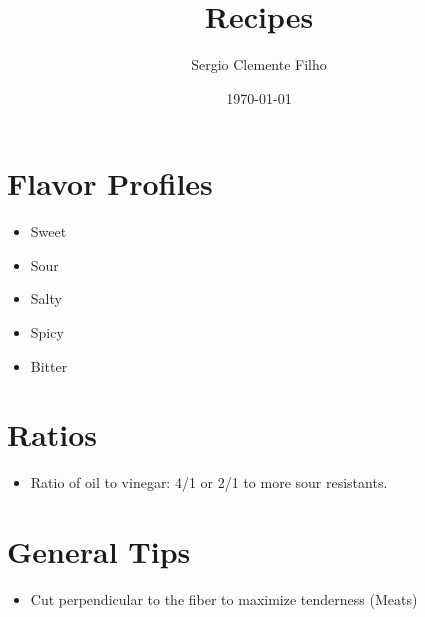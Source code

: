 \documentclass{article}
\title{Recipes}
\author{Sergio Clemente Filho}
\date{\today}
\begin{document}
\maketitle

\newpage

\tableofcontents{}

\newpage

\section{Flavor Profiles}
\begin{itemize}
	\item Sweet
	\item Sour
	\item Salty
	\item Spicy
	\item Bitter
\end{itemize}

\section{Ratios}
\begin{itemize}
	\item Ratio of oil to vinegar: 4/1 or 2/1 to more sour resistants.
\end{itemize}

\section{General Tips}
\begin{itemize}
	\item Cut perpendicular to the fiber to maximize tenderness (Meats)
\end{itemize}
\end{document}
